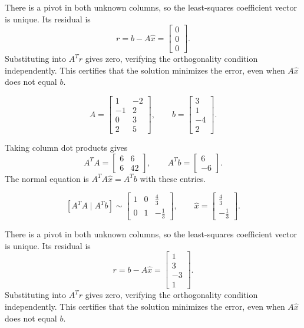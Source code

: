 There is a pivot in both unknown columns, so the least-squares coefficient vector is unique. Its residual is
\[ r=b-A\widehat x=\begin{bmatrix}0\\0\\0\end{bmatrix}.\]
Substituting into $A^Tr$ gives zero, verifying the orthogonality condition independently. This certifies that the solution minimizes the error, even when $A\widehat x$ does not equal $b$.

\[ A=\begin{bmatrix}1 & -2\\-1 & 2\\0 & 3\\2 & 5\end{bmatrix},\qquad b=\begin{bmatrix}3\\1\\-4\\2\end{bmatrix}.\]

Taking column dot products gives
\[ A^TA=\begin{bmatrix}6 & 6\\6 & 42\end{bmatrix},\qquad A^Tb=\begin{bmatrix}6\\-6\end{bmatrix}.\]
The normal equation is $A^TA\widehat x=A^Tb$ with these entries.

\[ [A^TA\mid A^Tb]\sim \begin{bmatrix}1 & 0 & \frac{4}{3}\\0 & 1 & - \frac{1}{3}\end{bmatrix},\qquad \widehat x=\begin{bmatrix}\frac{4}{3}\\- \frac{1}{3}\end{bmatrix}.\]

There is a pivot in both unknown columns, so the least-squares coefficient vector is unique. Its residual is
\[ r=b-A\widehat x=\begin{bmatrix}1\\3\\-3\\1\end{bmatrix}.\]
Substituting into $A^Tr$ gives zero, verifying the orthogonality condition independently. This certifies that the solution minimizes the error, even when $A\widehat x$ does not equal $b$.

